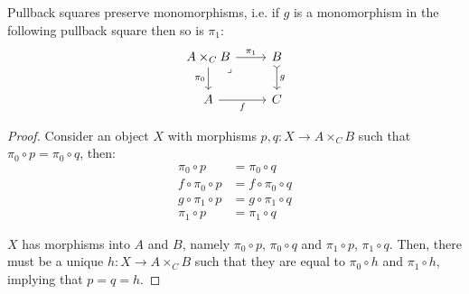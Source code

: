 \begin{theorem}
  Pullback squares preserve monomorphisms, i.e. if $g$ is a monomorphism in the
  following pullback square then so is $\pi_1$:
  \[\begin{tikzcd}[ampersand replacement=\&]
    {A\times_CB} \& B \\
    A \& C
    \arrow["g", tail, from=1-2, to=2-2]
    \arrow["f"', from=2-1, to=2-2]
    \arrow["{\pi_0}"', from=1-1, to=2-1]
    \arrow["{\pi_1}", from=1-1, to=1-2]
    \arrow["\lrcorner"{anchor=center, pos=0.125}, draw=none, from=1-1, to=2-2]
  \end{tikzcd}\]

  \begin{proof}
    Consider an object $X$ with morphisms $p, q: X\to A\times_C B$ such that
    $\pi_0 \circ p = \pi_0 \circ q$, then:
    \[
      \begin{aligned}
        \pi_0 \circ p &= \pi_0 \circ q\\
        f \circ \pi_0 \circ p &= f \circ \pi_0 \circ q\\
        g \circ \pi_1 \circ p &= g \circ \pi_1 \circ q\\
        \pi_1 \circ p &= \pi_1 \circ q
      \end{aligned}
    \]

    $X$ has morphisms into $A$ and $B$, namely $\pi_0 \circ p$, $\pi_0 \circ q$
    and $\pi_1 \circ p$, $\pi_1 \circ q$. Then, there must be a unique $h: X\to
    A\times_C B$ such that they are equal to $\pi_0 \circ h$ and $\pi_1 \circ
    h$, implying that $p=q=h$.
  \end{proof}
\end{theorem}

